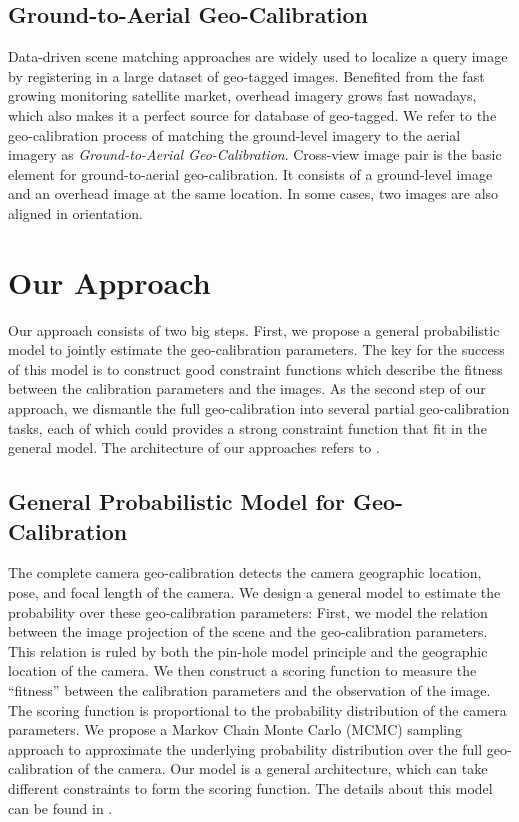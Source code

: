 \subsection{Ground-to-Aerial Geo-Calibration}
Data-driven scene matching approaches are widely used to localize a
query image by registering in a large dataset of geo-tagged images. 
Benefited from the fast growing monitoring satellite market, overhead
imagery grows fast nowadays, which also makes it a perfect source for
database of geo-tagged. We refer to the geo-calibration process of
matching the ground-level imagery to the aerial imagery as {\em
Ground-to-Aerial Geo-Calibration}.
%
Cross-view image pair is the basic element for ground-to-aerial
geo-calibration. It consists of a ground-level image and an overhead
image at the same location. In some cases, two images are also aligned
in orientation. 



\section{Our Approach}
Our approach consists of two big steps. First, we propose a general
probabilistic model to jointly estimate the geo-calibration
parameters. The key for the success of this model is to construct good
constraint functions which describe the fitness between the calibration
parameters and the images. As the second step of our approach, we
dismantle the full geo-calibration into several partial
geo-calibration tasks, each of which could provides a strong constraint
function that fit in the general model. The architecture of
our approaches refers to
.

\subsection{General Probabilistic Model for Geo-Calibration}
The complete camera geo-calibration detects the camera
geographic location, pose, and focal length of the camera.  We
design a general model to estimate the probability over these
geo-calibration parameters: First, we model the relation between the
image projection of the scene and the geo-calibration parameters. This
relation is ruled by both the pin-hole model principle and the
geographic location of the camera.
We then construct a scoring function to measure the ``fitness'' between the
calibration parameters and the observation of the image. 
The scoring function is proportional to the probability distribution
of the camera parameters. We propose a Markov Chain Monte
Carlo (MCMC) sampling approach to approximate the underlying
probability distribution over the full geo-calibration of the camera.
Our model is a general architecture, which can take different
constraints to form the scoring function. The details about this model
can be found in .

